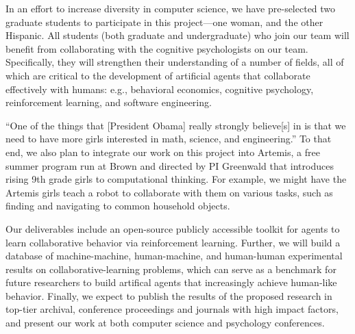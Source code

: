 In an effort to increase diversity in computer science, we have
pre-selected two graduate students to participate in this
project---one woman, and the other Hispanic.  All students (both
graduate and undergraduate) who join our team will benefit from collaborating with the cognitive psychologists on our team.
Specifically, they will strengthen their understanding of a number of
fields, all of which are critical to the development of artificial
agents that collaborate effectively with humans: e.g., behavioral
economics, cognitive psychology, reinforcement learning, and software
engineering.

``One of the things that [President Obama] really strongly believe[s]
in is that we need to have more girls interested in math, science, and
engineering.''  To that end, we also plan to integrate our work on
this project into Artemis, a free summer program run at Brown and
directed by PI Greenwald that introduces rising 9th grade girls to
computational thinking.
For example, we might have the Artemis girls teach a robot to
collaborate with them on various tasks, such as finding and navigating
to common household objects.

Our deliverables include an open-source publicly accessible toolkit for agents to learn collaborative behavior via reinforcement learning. Further, we will build a database of machine-machine, human-machine, and human-human experimental results on collaborative-learning problems, which can serve as a benchmark for future researchers to build artifical agents that increasingly achieve human-like behavior. 
%
Finally, we expect to publish the results of the proposed research in
top-tier archival, conference proceedings and journals with high
impact factors, and present our work at both computer science and
psychology conferences.




